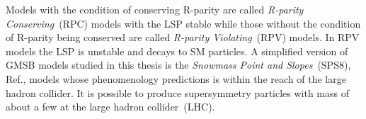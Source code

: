 Models with the condition of conserving R-parity are called \textit{R-parity Conserving}~(RPC) models with the LSP stable while 
those without the condition of R-parity being conserved are called \textit{R-parity Violating}~(RPV) models. In RPV models
the LSP is unstable and decays to SM particles.
A simplified version of GMSB models studied in this thesis is the \textit{Snowmass Point and Slopes}~(SPS8), Ref.\cite{SPS8}, models whose phenomenology predictions is within the reach of the large hadron collider. It is possible to produce supersymmetry particles with mass
of about a few \TeV at the large hadron collider~(LHC).
